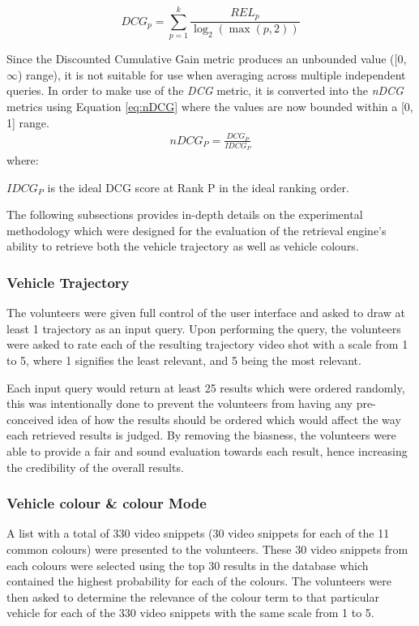 \begin{equation}
\label{eq:DCGk}
DCG_p = \sum_{p=1}^k\frac{REL_{p}}{\log_2 (\max (p,2))}
\end{equation}


Since the Discounted Cumulative Gain metric produces an unbounded value ([0, $\infty$) range), it is not suitable for use when averaging across multiple independent queries. In order to make use of the \textit{DCG} metric, it is converted into the \textit{nDCG} metrics using Equation \ref{eq:nDCG} where the values are now bounded within a [0, 1] range.
\begin{align}
\label{eq:nDCG}
\textit{nDCG}_P = \frac{DCG_P}{IDCG_P}
\end{align}
where:

\hspace{2em} $IDCG_P$ is the ideal DCG score at Rank P in the ideal ranking order.

The following subsections provides in-depth details on the experimental methodology which were designed for the evaluation of the retrieval engine's ability to retrieve both the vehicle trajectory as well as vehicle colours.


\subsubsection{Vehicle Trajectory}
 The volunteers were given full control of the user interface and asked to draw at least 1 trajectory as an input query. Upon performing the query, the volunteers were asked to rate each of the resulting trajectory video shot with a scale from 1 to 5, where 1 signifies the least relevant, and 5 being the most relevant.

 Each input query would return at least 25 results which were ordered randomly, this was intentionally done to prevent the volunteers from having any pre-conceived idea of how the results should be ordered which would affect the way each retrieved results is judged. By removing the biasness, the volunteers were able to provide a fair and sound evaluation towards each result, hence increasing the credibility of the overall results.



\subsubsection{Vehicle colour \& colour Mode}
\label{subsec:vehColor}
A list with a total of 330 video snippets (30 video snippets for each of the 11 common colours) were presented to the volunteers. These 30 video snippets from each colours were selected using the top 30 results in the database which contained the highest probability for each of the colours. The volunteers were then asked to determine the relevance of the colour term to that particular vehicle for each of the 330 video snippets with the same scale from 1 to 5.

